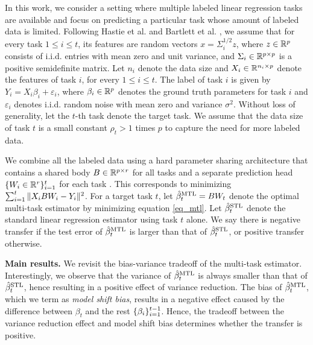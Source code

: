 In this work, we consider a setting where multiple labeled linear regression tasks are available and focus on predicting a particular task whose amount of labeled data is limited.
Following Hastie et al. \cite{HMRT19} and Bartlett et al. \cite{BLLT20}, we assume that for every task $1\le i\le t$, its features are random vectors $x = \Sigma_i^{1/2}z$, where $z\in\mathbb{R}^p$ consists of i.i.d. entries with mean zero and unit variance, and $\Sigma_i\in\mathbb{R}^{p\times p}$ is a positive semidefinite matrix.
Let $n_i$ denote the data size and $X_i\in\mathbb{R}^{n_i\times p}$ denote the features of task $i$, for every $1\le i\le t$.
The label of task $i$ is given by $Y_i = X_i\beta_i + \varepsilon_i$, where $\beta_i\in\mathbb{R}^p$ denotes the ground truth parameters for task $i$ and $\varepsilon_i$ denotes i.i.d. random noise with mean zero and variance $\sigma^2$.
Without loss of generality, let the $t$-th task denote the target task.
We assume that the data size of task $t$ is a small constant $\rho_t > 1$ times $p$ to capture the need for more labeled data.

We combine all the labeled data using a hard parameter sharing architecture that contains a shared body $B\in\mathbb{R}^{p\times r}$ for all tasks and a separate prediction head $\{W_i \in \mathbb{R}^{r}\}_{i=1}^t$ for each task \cite{R17,MTDNN19,WZR20}.
This corresponds to minimizing $ \sum_{i=1}^t \|X_i B W_i - Y_i\|^2$.
For a target task $t$,
let $\hat{\beta}_t^{\text{MTL}} = B W_t$ denote the optimal multi-task estimator by minimizing equation \eqref{eq_mtl}.
Let $\hat{\beta}_t^{\text{STL}}$ denote the standard linear regression estimator using task $t$ alone.
We say there is negative transfer if the test error of $\hat{\beta}_t^{\text{MTL}}$  is larger than that of $\hat{\beta}_t^{\text{STL}}$, or positive transfer otherwise.

\textbf{Main results.}
We revisit the bias-variance tradeoff of the multi-task estimator.
Interestingly, we observe that the variance of $\hat{\beta}_t^{\text{MTL}}$ is always smaller than that of $\hat{\beta}_t^{\text{STL}}$, hence resulting in a positive effect of variance reduction.
The bias of $\hat{\beta}_t^{\text{MTL}}$, which we term as \textit{model shift bias}, results in a negative effect caused by the difference between $\beta_t$ and the rest $\{\beta_i\}_{i=1}^{t-1}$.
Hence, the tradeoff between the variance reduction effect and model shift bias determines whether the transfer is positive.

